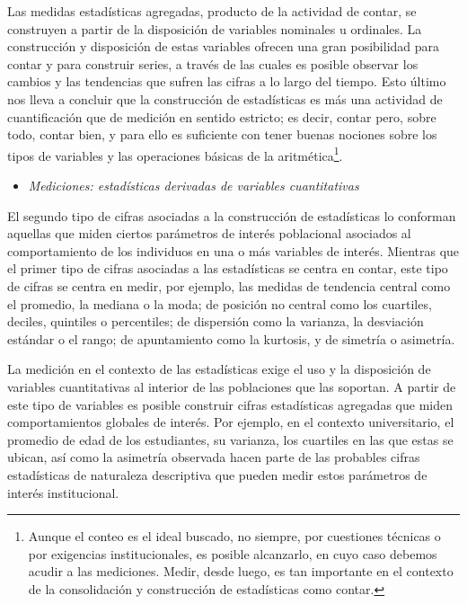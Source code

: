 \documentclass[
]{book}
\providecommand{\tightlist}{%
  \setlength{\itemsep}{0pt}\setlength{\parskip}{0pt}}
\begin{document}
Las medidas estadísticas agregadas, producto de la actividad de contar, se construyen a partir de la disposición de variables nominales u ordinales. La construcción y disposición de estas variables ofrecen una gran posibilidad para contar y para construir series, a través de las cuales es posible observar los cambios y las tendencias que sufren las cifras a lo largo del tiempo. Esto último nos lleva a concluir que la construcción de estadísticas es más una actividad de cuantificación que de medición en sentido estricto; es decir, contar pero, sobre todo, contar bien, y para ello es suficiente con tener buenas nociones sobre los tipos de variables y las operaciones básicas de la aritmética\footnote{Aunque el conteo es el ideal buscado, no siempre, por cuestiones técnicas o por exigencias institucionales, es posible alcanzarlo, en cuyo caso debemos acudir a las mediciones. Medir, desde luego, es tan importante en el contexto de la consolidación y construcción de estadísticas como contar.}.

\begin{itemize}
\tightlist
\item
  \emph{Mediciones: estadísticas derivadas de variables cuantitativas}
\end{itemize}

El segundo tipo de cifras asociadas a la construcción de estadísticas lo conforman aquellas que miden ciertos parámetros de interés poblacional asociados al comportamiento de los individuos en una o más variables de interés. Mientras que el primer tipo de cifras asociadas a las estadísticas se centra en contar, este tipo de cifras se centra en medir, por ejemplo, las medidas de tendencia central como el promedio, la mediana o la moda; de posición no central como los cuartiles, deciles, quintiles o percentiles; de dispersión como la varianza, la desviación estándar o el rango; de apuntamiento como la kurtosis, y de simetría o asimetría.

La medición en el contexto de las estadísticas exige el uso y la disposición de variables cuantitativas al interior de las poblaciones que las soportan. A partir de este tipo de variables es posible construir cifras estadísticas agregadas que miden comportamientos globales de interés. Por ejemplo, en el contexto universitario, el promedio de edad de los estudiantes, su varianza, los cuartiles en las que estas se ubican, así como la asimetría observada hacen parte de las probables cifras estadísticas de naturaleza descriptiva que pueden medir estos parámetros de interés institucional.
\end{document}
